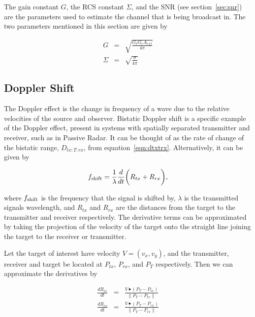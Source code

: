 \documentclass[12pt,openany,a4paper]{book}
\begin{document}
\bigskip

The gain constant $G$, the RCS constant $\Sigma$, and the SNR (see section~\ref{sec:snr}) are the parameters used to estimate the channel that is being broadcast in. The two parameters mentioned in this section are given by

\begin{eqnarray}
G &=& \sqrt{\frac{G_tG_r A_{eff}}{4\pi}}\\
\Sigma &=& \sqrt{\frac{\sigma}{4\pi}}
\end{eqnarray} 

\subsection{Doppler Shift}
\label{sec:doppler}
The Doppler effect is the change in frequency of a wave due to the relative velocities of the source and observer. Bistatic Doppler shift is a specific example of the Doppler effect, present in systems with spatially separated transmitter and receiver, such as in Passive Radar. It can be thought of as the rate of change of the bistatic range, $D_{tx\colon T\colon rx}$, from equation~\ref{eqn:dtxtrx}. Alternatively, it can be given by

\begin{equation}
f_{\textnormal{shift}} = \frac{1}{\lambda} \frac{d}{dt}\bigg( R_{tx} + R_{rx} \bigg),
\end{equation}

\bigskip

where $f_{\textnormal{shift}}$ is the frequency that the signal is shifted by, $\lambda$ is the transmitted signals wavelength, and $R_{tx}$ and $R_{rx}$ are the distances from the target to the transmitter and receiver respectively. The derivative terms can be approximated by taking the projection of the velocity of the target onto the straight line joining the target to the receiver or transmitter.

\bigskip

Let the target of interest have velocity $V = (v_x,v_y)$, and the transmitter, receiver and target be located at $P_{tx}$, $P_{rx}$, and $P_T$ respectively. Then we can approximate the derivatives by

\begin{eqnarray}
\frac{dR_{tx}}{dt} &=& \frac{V\bullet(P_T - P_{tx})}{\|P_T - P_{tx}\|} \\
\frac{dR_{rx}}{dt} &=& \frac{V\bullet(P_T - P_{rx})}{\|P_T - P_{rx}\|}
\end{eqnarray}
\end{document}

